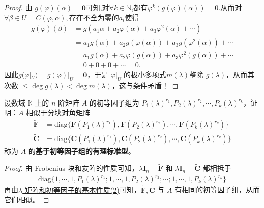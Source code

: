 \documentclass[../../main.tex]{subfiles}
\begin{document}
\begin{proof}
由 $g(\varphi)(\alpha)=\mathbf{0}$可知,对$\forall k\in \mathbb{N}$,都有$\varphi^k(g(\varphi)(\alpha))=0$.从而对$\forall \beta \in U=C(\varphi,\alpha),$存在不全为零的$a_i$使得
\begin{align*}
g(\varphi)(\beta)&=g\left( a_1\alpha +a_2\varphi \left( \alpha \right) +a_3\varphi ^2\left( \alpha \right) +\cdots \right) 
\\
&=a_1g\left( \alpha \right) +a_2g\left( \varphi \left( \alpha \right) \right) +a_3g\left( \varphi ^2\left( \alpha \right) \right) +\cdots 
\\
&=a_1g\left( \alpha \right) +a_2\varphi \left( g\left( \alpha \right) \right) +a_3\varphi ^2\left( g\left( \alpha \right) \right) +\cdots \\
&=0+0+0+\cdots=0.
\end{align*}
因此$g(\varphi|_U)=g(\varphi)|_U = \mathbf{0}$，于是 $\varphi|_U$ 的极小多项式$m(\lambda)$整除 $g(\lambda)$，从而其次数 $\leqslant \deg g(\lambda)<\deg m(\lambda)$，这与条件矛盾！
\end{proof}

\begin{theorem}[基于初等因子组的有理标准型]\label{theorem:基于初等因子组的有理标准型}
设数域 $\mathbb{K}$ 上的 $n$ 阶矩阵 $A$ 的初等因子组为 $P_1(\lambda)^{r_1},P_2(\lambda)^{r_2},\cdots,P_k(\lambda)^{r_k}$，证明：$A$ 相似于分块对角矩阵
\begin{align*}
\widetilde{\boldsymbol{F}}&=\mathrm{diag}\{\boldsymbol{F}(P_1(\lambda)^{r_1}),\boldsymbol{F}(P_2(\lambda)^{r_2}),\cdots,\boldsymbol{F}(P_k(\lambda)^{r_k})\}\\
\widetilde{\boldsymbol{C}}&=\mathrm{diag}\{\boldsymbol{C}(P_1(\lambda)^{r_1}),\boldsymbol{C}(P_2(\lambda)^{r_2}),\cdots,\boldsymbol{C}(P_k(\lambda)^{r_k})\}
\end{align*}
称为 $A$ 的\textbf{基于初等因子组的有理标准型}。
\end{theorem}
\begin{proof}
由 Frobenius 块和友阵的性质可知，$\lambda\boldsymbol{I}_n - \widetilde{\boldsymbol{F}}$ 和 $\lambda\boldsymbol{I}_n - \widetilde{\boldsymbol{C}}$ 都相抵于
\begin{align*}
\mathrm{diag}\{1,\cdots,1,P_1(\lambda)^{r_1};1,\cdots,1,P_2(\lambda)^{r_2};\cdots;1,\cdots,1,P_k(\lambda)^{r_k}\}
\end{align*}
再由\hyperref[theorem:lambda-矩阵和初等因子的基本性质]{$\lambda$-矩阵和初等因子的基本性质(2)}可知，$\widetilde{\boldsymbol{F}},\widetilde{\boldsymbol{C}}$ 与 $A$ 有相同的初等因子组，从而它们相似。
\end{proof}
\end{document}
